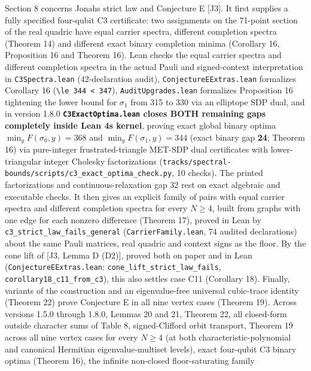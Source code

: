 \documentclass[11pt,a4paper]{article}
\begin{document}
Section 8 concerns Jonah\textquotesingle s strict law and Conjecture E {[}J3{]}. It first supplies a fully specified
four-qubit C3 certificate: two assignments on the 71-point section of the real quadric have equal
carrier spectra, different completion spectra (Theorem 14) and different exact binary completion
minima (Corollary 16, Proposition 16\textquotesingle{} and Theorem 16\textquotesingle\textquotesingle). Lean checks the equal carrier spectra and
different completion spectra in the actual Pauli and signed-context interpretation in \texttt{C3Spectra.lean}
(42-declaration audit), \nolinkurl{ConjectureEExtras.lean} formalizes Corollary 16 (\texttt{\textbackslash{}le\ 344\ \textless{}\ 347}),
\nolinkurl{AuditUpgrades.lean} formalizes Proposition 16\textquotesingle{} tightening the lower bound for \(\sigma_1\) from 315 to
330 via an elliptope SDP dual, and in version 1.8.0 \textbf{\nolinkurl{C3ExactOptima.lean} closes BOTH remaining gaps
completely inside Lean 4\textquotesingle s kernel}, proving exact global binary optima
\textbf{\(\min_y F(\sigma_0,y) = 368\)} and \textbf{\(\min_y F(\sigma_1,y) = 344\)} (exact binary gap \textbf{24};
Theorem 16\textquotesingle\textquotesingle) via pure-integer frustrated-triangle MET-SDP dual certificates with lower-triangular
integer Cholesky factorizations (\nolinkurl{tracks/spectral-bounds/scripts/c3_exact_optima_check.py}, 10 checks). The printed
factorizations and continuous-relaxation gap 32 rest on exact algebraic and executable checks. It then
gives an explicit family of pairs with equal carrier spectra and different completion spectra for every
\(N\ge4\), built from graphs with one edge for each nonzero difference (Theorem 17), proved in Lean by
\nolinkurl{c3_strict_law_fails_general} (\nolinkurl{CarrierFamily.lean}, 74 audited declarations) about the same Pauli
matrices, real quadric and context signs as the floor. By the cone lift of {[}J3, Lemma D (D2){]}, proved
both on paper and in Lean (\nolinkurl{ConjectureEExtras.lean}: \nolinkurl{cone_lift_strict_law_fails},
\nolinkurl{corollary18_c11_from_c3}), this also settles case C11 (Corollary 18). Finally, variants of the
construction and an eigenvalue-free universal cubic-trace identity (Theorem 22) prove Conjecture E in all
nine vertex cases (Theorem 19). Across versions 1.5.0 through 1.8.0, Lemmas 20 and 21, Theorem 22, all
closed-form outside character sums of Table 8, signed-Clifford orbit transport, Theorem 19 across all nine
vertex cases for every \(N\ge4\) (at both characteristic-polynomial and canonical Hermitian eigenvalue-multiset
levels), exact four-qubit C3 binary optima (Theorem 16\textquotesingle\textquotesingle), the infinite non-closed floor-saturating family
\end{document}
